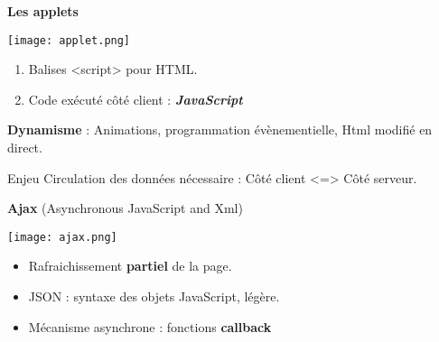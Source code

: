 		\begin{frame}
			\textbf{Les applets}\\
				\begin{center}\texttt{[image: applet.png]}\end{center}
				\begin{enumerate}
				\item Balises <script> pour HTML.
				\item Code exécuté côté client : \textbf{\textit{JavaScript}}
				\end{enumerate}
				
				\textbf{Dynamisme} : Animations, programmation évènementielle, Html modifié en direct.
				
				\begin{block}{Enjeu}
				Circulation des données nécessaire : Côté client <=> Côté serveur.
				\end{block}
		\end{frame}
		
		\begin{frame}
			\textbf{Ajax} (Asynchronous JavaScript and Xml)\\
				\begin{center}\texttt{[image: ajax.png]}\end{center}
				
				\begin{itemize}
				\item Rafraichissement \textbf{partiel} de la page.\\ %
				\item JSON : syntaxe des objets JavaScript, légère. \\ 
				\item Mécanisme asynchrone : fonctions \textbf{callback}
				\end{itemize}
		\end{frame}
		
